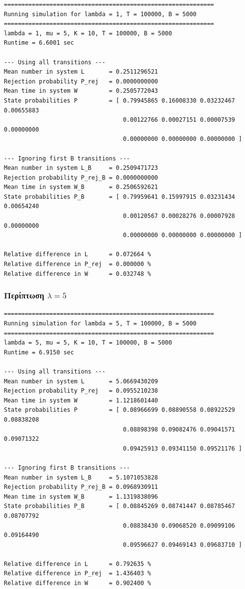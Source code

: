 \documentclass{article}
\begin{document}
{
\begin{verbatim}
============================================================
Running simulation for lambda = 1, T = 100000, B = 5000
============================================================
lambda = 1, mu = 5, K = 10, T = 100000, B = 5000
Runtime = 6.6001 sec

--- Using all transitions ---
Mean number in system L       = 0.2511296521
Rejection probability P_rej   = 0.0000000000
Mean time in system W         = 0.2505772043
State probabilities P         = [ 0.79945865 0.16008330 0.03232467 0.00655883
                                  0.00122766 0.00027151 0.00007539 0.00000000
                                  0.00000000 0.00000000 0.00000000 ]

--- Ignoring first B transitions ---
Mean number in system L_B     = 0.2509471723
Rejection probability P_rej_B = 0.0000000000
Mean time in system W_B       = 0.2506592621
State probabilities P_B       = [ 0.79959641 0.15997915 0.03231434 0.00654240
                                  0.00120567 0.00028276 0.00007928 0.00000000
                                  0.00000000 0.00000000 0.00000000 ]

Relative difference in L      = 0.072664 %
Relative difference in P_rej  = 0.000000 %
Relative difference in W      = 0.032748 %
\end{verbatim}
}

\subsubsection*{Περίπτωση $\lambda = 5$}

{
\begin{verbatim}
============================================================
Running simulation for lambda = 5, T = 100000, B = 5000
============================================================
lambda = 5, mu = 5, K = 10, T = 100000, B = 5000
Runtime = 6.9150 sec

--- Using all transitions ---
Mean number in system L       = 5.0669430209
Rejection probability P_rej   = 0.0955210238
Mean time in system W         = 1.1218601440
State probabilities P         = [ 0.08966699 0.08890558 0.08922529 0.08838208
                                  0.08898398 0.09082476 0.09041571 0.09071322
                                  0.09425913 0.09341150 0.09521176 ]

--- Ignoring first B transitions ---
Mean number in system L_B     = 5.1071053828
Rejection probability P_rej_B = 0.0968930911
Mean time in system W_B       = 1.1319838096
State probabilities P_B       = [ 0.08845269 0.08741447 0.08785467 0.08707792
                                  0.08838430 0.09068520 0.09099106 0.09164490
                                  0.09596627 0.09469143 0.09683710 ]

Relative difference in L      = 0.792635 %
Relative difference in P_rej  = 1.436403 %
Relative difference in W      = 0.902400 %
\end{verbatim}
}
\end{document}
